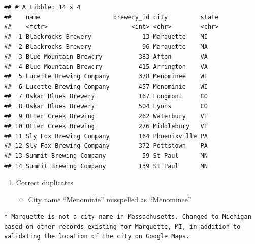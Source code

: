 \documentclass[]{article}
\newenvironment{Shaded}{\begin{snugshade}}{\end{snugshade}}
\newcommand{\KeywordTok}[1]{\textcolor[rgb]{0.13,0.29,0.53}{\textbf{#1}}}
\newcommand{\DataTypeTok}[1]{\textcolor[rgb]{0.13,0.29,0.53}{#1}}
\newcommand{\DecValTok}[1]{\textcolor[rgb]{0.00,0.00,0.81}{#1}}
\newcommand{\StringTok}[1]{\textcolor[rgb]{0.31,0.60,0.02}{#1}}
\newcommand{\CommentTok}[1]{\textcolor[rgb]{0.56,0.35,0.01}{\textit{#1}}}
\newcommand{\OperatorTok}[1]{\textcolor[rgb]{0.81,0.36,0.00}{\textbf{#1}}}
\newcommand{\NormalTok}[1]{#1}
\providecommand{\tightlist}{%
  \setlength{\itemsep}{0pt}\setlength{\parskip}{0pt}}
\begin{document}
\begin{verbatim}
## # A tibble: 14 x 4
##    name                    brewery_id city         state
##    <fctr>                       <int> <chr>        <chr>
##  1 Blackrocks Brewery              13 Marquette    MI   
##  2 Blackrocks Brewery              96 Marquette    MA   
##  3 Blue Mountain Brewery          383 Afton        VA   
##  4 Blue Mountain Brewery          415 Arrington    VA   
##  5 Lucette Brewing Company        378 Menominee    WI   
##  6 Lucette Brewing Company        457 Menominie    WI   
##  7 Oskar Blues Brewery            167 Longmont     CO   
##  8 Oskar Blues Brewery            504 Lyons        CO   
##  9 Otter Creek Brewing            262 Waterbury    VT   
## 10 Otter Creek Brewing            276 Middlebury   VT   
## 11 Sly Fox Brewing Company        164 Phoenixville PA   
## 12 Sly Fox Brewing Company        372 Pottstown    PA   
## 13 Summit Brewing Company          59 St Paul      MN   
## 14 Summit Brewing Company         139 St Paul      MN
\end{verbatim}

\begin{enumerate}
\def\labelenumi{\arabic{enumi})}
\setcounter{enumi}{3}
\item
  Correct duplicates

  \begin{itemize}
  \tightlist
  \item
    City name ``Menominie'' misspelled as ``Menominee''
  \end{itemize}
\end{enumerate}

\begin{Shaded}
\end{Shaded}

\begin{verbatim}
* Marquette is not a city name in Massachusetts. Changed to Michigan based on other records existing for Marquette, MI, in addition to validating the location of the city on Google Maps.
\end{verbatim}
\end{document}
